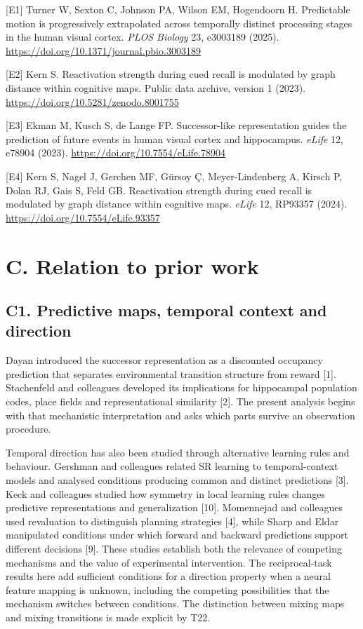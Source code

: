 \documentclass[11pt,a4paper]{article}
\begin{document}
{[}E1{]} Turner W, Sexton C, Johnson PA, Wilson EM, Hogendoorn H.
Predictable motion is progressively extrapolated across temporally
distinct processing stages in the human visual cortex. \emph{PLOS
Biology} 23, e3003189 (2025).
\url{https://doi.org/10.1371/journal.pbio.3003189}

{[}E2{]} Kern S. Reactivation strength during cued recall is modulated
by graph distance within cognitive maps. Public data archive, version 1
(2023). \url{https://doi.org/10.5281/zenodo.8001755}

{[}E3{]} Ekman M, Kusch S, de Lange FP. Successor-like representation
guides the prediction of future events in human visual cortex and
hippocampus. \emph{eLife} 12, e78904 (2023).
\url{https://doi.org/10.7554/eLife.78904}

{[}E4{]} Kern S, Nagel J, Gerchen MF, Gürsoy Ç, Meyer-Lindenberg A,
Kirsch P, Dolan RJ, Gais S, Feld GB. Reactivation strength during cued
recall is modulated by graph distance within cognitive maps.
\emph{eLife} 12, RP93357 (2024).
\url{https://doi.org/10.7554/eLife.93357}

\clearpage

\section{C. Relation to prior work}\label{c.-relation-to-prior-work}

\subsection{C1. Predictive maps, temporal context and
direction}\label{c1.-predictive-maps-temporal-context-and-direction}

Dayan introduced the successor representation as a discounted occupancy
prediction that separates environmental transition structure from reward
{[}1{]}. Stachenfeld and colleagues developed its implications for
hippocampal population codes, place fields and representational
similarity {[}2{]}. The present analysis begins with that mechanistic
interpretation and asks which parts survive an observation procedure.

Temporal direction has also been studied through alternative learning
rules and behaviour. Gershman and colleagues related SR learning to
temporal-context models and analysed conditions producing common and
distinct predictions {[}3{]}. Keck and colleagues studied how symmetry
in local learning rules changes predictive representations and
generalization {[}10{]}. Momennejad and colleagues used revaluation to
distinguish planning strategies {[}4{]}, while Sharp and Eldar
manipulated conditions under which forward and backward predictions
support different decisions {[}9{]}. These studies establish both the
relevance of competing mechanisms and the value of experimental
intervention. The reciprocal-task results here add sufficient conditions
for a direction property when a neural feature mapping is unknown,
including the competing possibilities that the mechanism switches
between conditions. The distinction between mixing maps and mixing
transitions is made explicit by T22.
\end{document}
